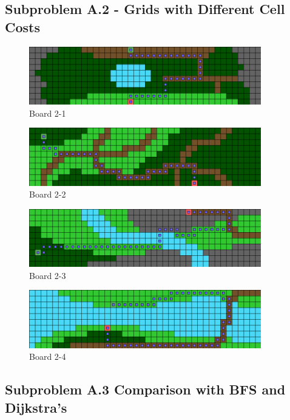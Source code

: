 \documentclass{article}
\begin{document}
\subsection*{Subproblem A.2 - Grids with Different Cell Costs}
	\begin{figure}[!htb]
		\caption{Board 2-1}
		\includegraphics[width=0.9\textwidth]{BImg1.png}
	\end{figure}

	\begin{figure}[!htb]
		\caption{Board 2-2}
		\includegraphics[width=0.9\textwidth]{BImg2.png}
	\end{figure}

	\begin{figure}[!htb]
		\caption{Board 2-3}
		\includegraphics[width=0.9\textwidth]{BImg3.png}
	\end{figure}

	\begin{figure}[!htb]
		\caption{Board 2-4}
		\includegraphics[width=0.9\textwidth]{BImg4.png}
	\end{figure}
\FloatBarrier
\subsection*{Subproblem A.3 Comparison with BFS and Dijkstra's}
\end{document}
